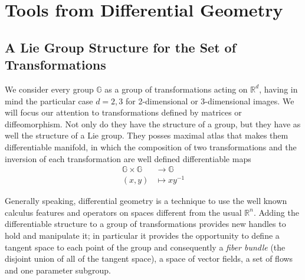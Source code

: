 \chapter{Tools from Differential Geometry}\label{ch:tools}

%

\section{A Lie Group Structure for the Set of Transformations}\label{se:finite_lie_group}

We consider every group $\mathbb{G}$ as a group of transformations acting on $\mathbb{R}^{d}$, having in mind the particular case $d=2,3$ for 2-dimensional or 3-dimensional images.
We will focus our attention to transformations defined by matrices or diffeomorphism. Not only do they have the structure of a group, but they have as well the structure of a Lie group. They posses maximal atlas that makes them differentiable manifold, in which the composition of two transformations and the inversion of each transformation are well defined differentiable maps
\begin{align*}
\mathbb{G} \times \mathbb{G} & \longrightarrow  \mathbb{G}    \\
(x,y) &\longmapsto  x y^{-1}
\end{align*}

Generally speaking, differential geometry is a technique to use the well known calculus features and operators on spaces different from the usual $\mathbb{R}^{n}$. Adding the differentiable structure to a group of transformations provides new handles to hold and manipulate it; in particular it provides the opportunity to define a tangent space to each point of the group and consequently a \emph{fiber bundle} (the disjoint union of all of the tangent space), a space of vector fields, a set of flows and one parameter subgroup.

